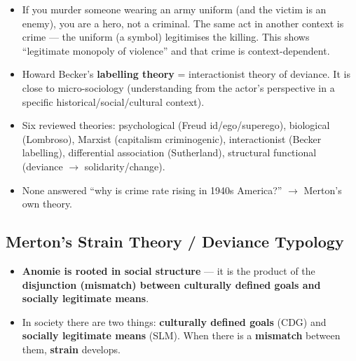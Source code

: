 \begin{ExampleBox}
\begin{itemize}
\item If you murder someone wearing an army uniform (and the victim is an enemy), you are a hero, not a criminal. The same act in another context is crime --- the uniform (a symbol) legitimises the killing. This shows ``legitimate monopoly of violence'' and that crime is context-dependent.
\end{itemize}
\end{ExampleBox}

\begin{DataFact}
\begin{itemize}
\item Howard Becker's \textbf{labelling theory} = interactionist theory of deviance. It is close to micro-sociology (understanding from the actor's perspective in a specific historical/social/cultural context).
\end{itemize}
\end{DataFact}

\begin{QuickRevision}
\begin{itemize}
\item Six reviewed theories: psychological (Freud id/ego/superego), biological (Lombroso), Marxist (capitalism criminogenic), interactionist (Becker labelling), differential association (Sutherland), structural functional (deviance $\rightarrow$ solidarity/change).
\item None answered ``why is crime rate rising in 1940s America?'' $\rightarrow$ Merton's own theory.
\end{itemize}
\end{QuickRevision}

\sectiondivider

\subsection{Merton's Strain Theory / Deviance Typology}

\begin{KeyConcept}
\begin{itemize}
\item \textbf{Anomie is rooted in social structure} --- it is the product of the \textbf{disjunction (mismatch) between culturally defined goals and socially legitimate means}.
\item In society there are two things: \textbf{culturally defined goals} (CDG) and \textbf{socially legitimate means} (SLM). When there is a \textbf{mismatch} between them, \textbf{strain} develops.
\end{itemize}
\end{KeyConcept}

